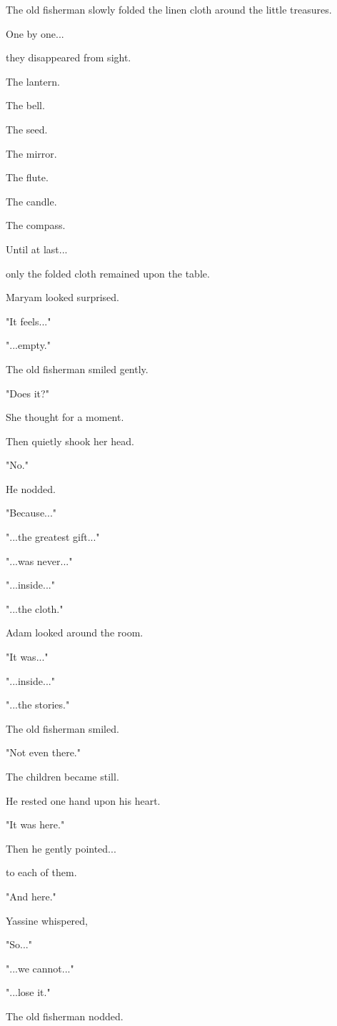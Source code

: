 \documentclass[12pt,openany]{book}
\begin{document}
The old fisherman slowly folded the linen cloth around the little treasures.

One by one...

they disappeared from sight.

The lantern.

The bell.

The seed.

The mirror.

The flute.

The candle.

The compass.

Until at last...

only the folded cloth remained upon the table.

Maryam looked surprised.

"It feels..."

"...empty."

The old fisherman smiled gently.

"Does it?"

She thought for a moment.

Then quietly shook her head.

"No."

He nodded.

"Because..."

"...the greatest gift..."

"...was never..."

"...inside..."

"...the cloth."

Adam looked around the room.

"It was..."

"...inside..."

"...the stories."

The old fisherman smiled.

"Not even there."

The children became still.

He rested one hand upon his heart.

"It was here."

Then he gently pointed...

to each of them.

"And here."

Yassine whispered,

"So..."

"...we cannot..."

"...lose it."

The old fisherman nodded.
\end{document}
